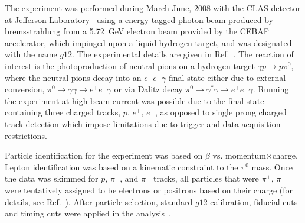 \documentclass[aps,prc,twocolumn,floatfix,showpacs,preprintnumbers,amsmath,amssymb,superscriptaddress,linenumbers]{revtex4-1}
\begin{document}

The experiment was performed during March-June, 2008
with the CLAS detector at Jefferson Laboratory~\cite{meck} using a energy-tagged photon beam produced by 
bremsstrahlung from a 5.72~GeV electron beam provided by the CEBAF 
accelerator, which impinged upon a liquid hydrogen target,
and was designated with the name $g12$. 
The experimental details are given in Ref.~\cite{g12}. The reaction 
of interest is the photoproduction of neutral pions on a hydrogen 
target $\gamma p\rightarrow p\pi^0$, 
where the neutral pions decay into an $e^+e^-\gamma$ final state either due to external conversion, $\pi^0 \rightarrow\gamma\gamma 
\rightarrow e^+e^-\gamma$ or via Dalitz decay $\pi^0
\rightarrow\gamma^\ast\gamma\rightarrow e^+e^-\gamma$. Running the 
experiment at high beam current was possible due to the final state 
containing three charged tracks, $p$, $e^+$, $e^-$, as opposed to single 
prong charged track detection which impose limitations due to trigger 
and data acquisition restrictions.


Particle identification for the experiment was based on $\beta$ vs. momentum$\times$charge. 
Lepton identification was based on a kinematic constraint to the $\pi^0$ mass. 
Once the data was skimmed for $p$, $\pi^+$, and $\pi^-$ tracks, 
all particles that were $\pi^+$, $\pi^-$ were tentatively assigned 
to be electrons or positrons based on their charge (for details, 
see Ref.~\cite{Kunkel,KunkelPhD}). After particle selection, standard $g12$ 
calibration, fiducial cuts and timing cuts were applied 
in the analysis~\cite{g12}.
\end{document}
